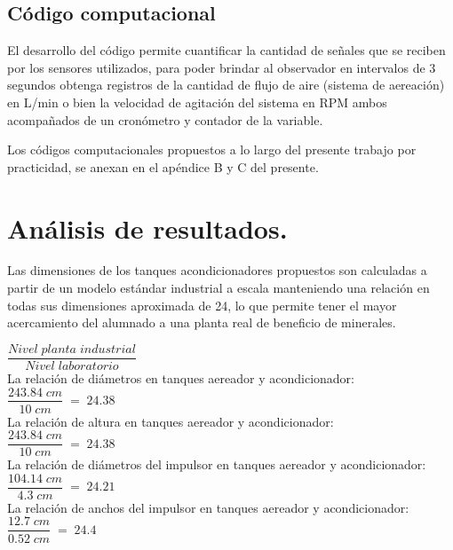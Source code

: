 \documentclass[11pt,letter
								]
								{article}
\begin{document}
		



		
		\subsection{Código computacional}

	

		El desarrollo del código permite cuantificar la cantidad de señales que se reciben por los sensores utilizados, para poder brindar al observador en  intervalos de 3 segundos obtenga registros de la cantidad de flujo de aire (sistema de aereación) en L/min o bien la velocidad de agitación del sistema en RPM ambos acompañados de un cronómetro y contador de la variable. 

		Los códigos  computacionales  propuestos a lo largo del presente trabajo por practicidad, se anexan en el  apéndice B y C    del presente.
	







\section{Análisis de resultados. }

Las dimensiones de los tanques acondicionadores propuestos son calculadas a partir de un modelo estándar industrial a escala manteniendo una  relación en todas  sus dimensiones aproximada de 24,   lo que permite tener el mayor acercamiento del alumnado a una planta real de beneficio de minerales. 

\begin{center}
$\dfrac { Nivel \;planta \;industrial}  {Nivel \;laboratorio} $ \\[0.5cm]

La relación de diámetros en tanques aereador y acondicionador:\\

$\dfrac{243.84\;cm}{10\; cm}\;=\;24.38$\\[0.5cm]


La relación de altura en tanques aereador y acondicionador:\\
$\dfrac{243.84\;cm}{10\; cm}\;=\;24.38$\\[0.5cm]


La relación de diámetros del impulsor en tanques aereador y acondicionador:\\
$\dfrac{104.14 \;cm}{4.3\; cm}\;=\;24.21$\\[0.5cm]

La relación de anchos del impulsor en tanques aereador y acondicionador:\\
$\dfrac{12.7 \;cm}{0.52\; cm}\;=\;24.4$\\[0.5cm]

\end{center}
\end{document}
